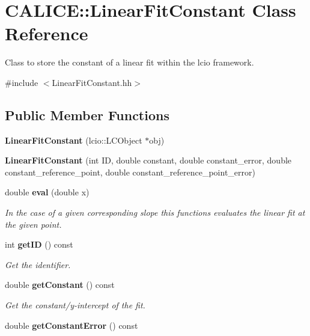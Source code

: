 \section{CALICE::LinearFitConstant Class Reference}
\label{classCALICE_1_1LinearFitConstant}


Class to store the constant of a linear fit within the lcio framework.  


{\ttfamily \#include $<$LinearFitConstant.hh$>$}\subsection*{Public Member Functions}
\begin{DoxyCompactItemize}
\item 
{\bfseries LinearFitConstant} (lcio::LCObject $\ast$obj)\label{classCALICE_1_1LinearFitConstant_aad304d55b35c64a6ccc10f6678bea491}

\item 
{\bfseries LinearFitConstant} (int ID, double constant, double constant\_\-error, double constant\_\-reference\_\-point, double constant\_\-reference\_\-point\_\-error)\label{classCALICE_1_1LinearFitConstant_ab237e9f47438621313de684f516b5eea}

\item 
double {\bf eval} (double x)
\begin{DoxyCompactList}\small\item\em In the case of a given corresponding slope this functions evaluates the linear fit at the given point. \item\end{DoxyCompactList}\item 
int {\bf getID} () const \label{classCALICE_1_1LinearFitConstant_ad6dac20732c9065577e04b1057d4cba5}

\begin{DoxyCompactList}\small\item\em Get the identifier. \item\end{DoxyCompactList}\item 
double {\bf getConstant} () const \label{classCALICE_1_1LinearFitConstant_a4d3578f48272ce09e288dde99c7081bf}

\begin{DoxyCompactList}\small\item\em Get the constant/y-\/intercept of the fit. \item\end{DoxyCompactList}\item 
double {\bf getConstantError} () const \label{classCALICE_1_1LinearFitConstant_a91e9290960a2d85f39938b46cfe3f92b}


\end{DoxyCompactItemize}
